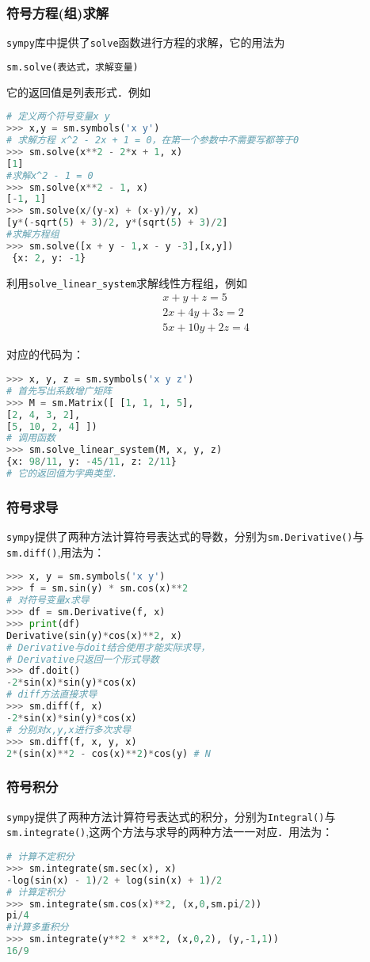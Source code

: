 \subsubsection{符号方程(组)求解}
\verb|sympy|库中提供了\verb|solve|函数进行方程的求解，它的用法为
\begin{lstlisting}[language=python]
sm.solve(表达式，求解变量)
\end{lstlisting}
它的返回值是列表形式．例如
\begin{lstlisting}[language=python]
# 定义两个符号变量x y
>>> x,y = sm.symbols('x y')
# 求解方程 x^2 - 2x + 1 = 0，在第一个参数中不需要写都等于0
>>> sm.solve(x**2 - 2*x + 1, x)
[1] 
#求解x^2 - 1 = 0
>>> sm.solve(x**2 - 1, x)
[-1, 1]
>>> sm.solve(x/(y-x) + (x-y)/y, x)
[y*(-sqrt(5) + 3)/2, y*(sqrt(5) + 3)/2]
#求解方程组
>>> sm.solve([x + y - 1,x - y -3],[x,y])
 {x: 2, y: -1}
\end{lstlisting}

利用\verb|solve_linear_system|求解线性方程组，例如
\begin{align}
x+y+z=5 \\
2 x+4 y+3 z=2 \\
5 x+10 y+2 z=4
\end{align}

对应的代码为：
\begin{lstlisting}[language=python]
>>> x, y, z = sm.symbols('x y z')
# 首先写出系数增广矩阵
>>> M = sm.Matrix([ [1, 1, 1, 5],
[2, 4, 3, 2],
[5, 10, 2, 4] ])
# 调用函数
>>> sm.solve_linear_system(M, x, y, z)
{x: 98/11, y: -45/11, z: 2/11}
# 它的返回值为字典类型．
\end{lstlisting}

\subsubsection{符号求导}
\verb|sympy|提供了两种方法计算符号表达式的导数，分别为\verb|sm.Derivative()|与\verb|sm.diff()|,用法为：
\begin{lstlisting}[language=python]
>>> x, y = sm.symbols('x y')
>>> f = sm.sin(y) * sm.cos(x)**2
# 对符号变量x求导
>>> df = sm.Derivative(f, x)
>>> print(df)
Derivative(sin(y)*cos(x)**2, x)
# Derivative与doit结合使用才能实际求导，
# Derivative只返回一个形式导数
>>> df.doit() 
-2*sin(x)*sin(y)*cos(x)
# diff方法直接求导
>>> sm.diff(f, x)
-2*sin(x)*sin(y)*cos(x)
# 分别对x,y,x进行多次求导
>>> sm.diff(f, x, y, x)
2*(sin(x)**2 - cos(x)**2)*cos(y) # N
\end{lstlisting}

\subsubsection{符号积分}
\verb|sympy|提供了两种方法计算符号表达式的积分，分别为\verb|Integral()|与\verb|sm.integrate()|,这两个方法与求导的两种方法一一对应．用法为：
\begin{lstlisting}[language=python]
# 计算不定积分
>>> sm.integrate(sm.sec(x), x)
-log(sin(x) - 1)/2 + log(sin(x) + 1)/2
# 计算定积分
>>> sm.integrate(sm.cos(x)**2, (x,0,sm.pi/2))
pi/4
#计算多重积分
>>> sm.integrate(y**2 * x**2, (x,0,2), (y,-1,1))
16/9
\end{lstlisting}
